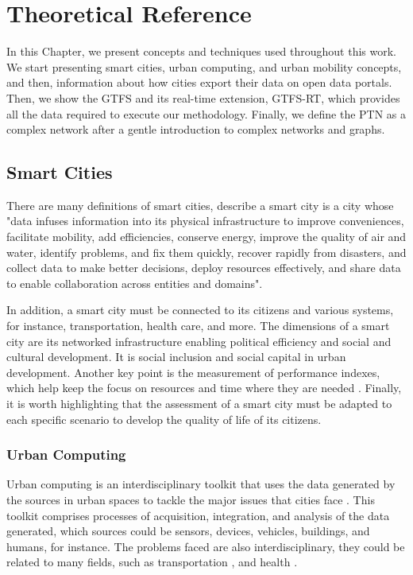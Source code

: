 \chapter{Theoretical Reference}
\label{cap2}

\vspace{-1.9cm}

In this Chapter, we present concepts and techniques used throughout this work. We start
presenting smart cities, urban computing, and urban mobility concepts, and then,
information about how cities export their data 
on open data portals. Then, we show the GTFS
and its real-time extension, GTFS-RT,
which provides all the data required to execute our methodology.
Finally, we define the PTN as a complex network after 
a gentle introduction to complex networks and graphs.

\section{Smart Cities}
There are many definitions of smart cities,  describe
a smart city is a city whose "data infuses information into its physical infrastructure to improve
conveniences, facilitate mobility, add efficiencies, conserve energy,
improve the quality of air and water, identify problems, and fix them
quickly, recover rapidly from disasters, and collect data to make better
decisions, deploy resources effectively, and share data to enable
collaboration across entities and domains".

In addition, a smart city must be connected to its citizens and 
various systems, for instance, transportation, health care, and more.
The dimensions of a smart city are its networked infrastructure enabling
political efficiency and social and cultural development. It is social inclusion
and social capital in urban development. Another key point %
is the measurement of performance indexes, which help keep the focus 
on resources and time where they are needed \cite{smart_cities_SLR}. Finally, it is worth highlighting that the assessment of a smart city must be adapted to each 
specific scenario to develop the quality of life of its citizens.

\subsection{Urban Computing}
Urban computing is an interdisciplinary toolkit that uses the data generated by the sources in 
urban spaces to tackle the major issues that cities face \cite{urban_computing}. 
This toolkit comprises processes of acquisition, integration, and analysis of the data
generated, which sources could be sensors, devices, vehicles, buildings, and humans,
for instance. The problems faced are also interdisciplinary, they could be related to
many fields, such as 
transportation \cite{Silveira2015, 10.1145/3394486.3412856, GTFS-RT_delays_2017, GTFS-RT_delays_2022, routableTimetableGTFS, GTFS-RT_delays_2022-ADWIN}, 
and health \cite{Ro2020, Saran2020, Chang2020, Sonkin2020}.



